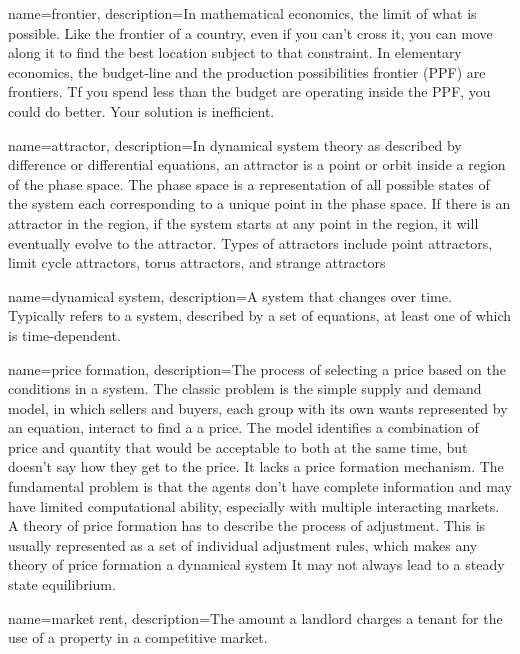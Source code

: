 {
name=frontier,
description={In mathematical economics, the limit of what is possible. Like the frontier of a country, even if you can't cross it, you can move along it to find the best location  subject to that constraint. In elementary economics, the budget-line and the production possibilities frontier (PPF) are  frontiers. Tf you spend less than the budget are operating inside the PPF, you could do better. Your solution is inefficient. }
}

{
name=attractor,
description={In \gls{dynamical system} theory as described by difference or differential equations, an attractor is a point or orbit inside a region of the phase space. The phase space is a representation of all possible states of the system each corresponding to a unique point in the phase space. If there is an attractor in the region, if the system starts at any point in the region, it will eventually evolve to the attractor. Types of attractors include point attractors, limit cycle attractors, torus attractors, and strange attractors}
}

{
name=dynamical system,
description={A system that changes over time. Typically refers to %
a system, described by a set of equations, at least one of which is time-dependent.}
}

{
name=price formation,
description={The process of selecting a price based on the conditions in a system. The classic problem is the simple supply and demand model, in which sellers and buyers, each group with its own wants represented by an equation, interact to find a a price. The model  identifies a combination of price and quantity that would be acceptable to both at the same time, but doesn't say how they get to the price. It lacks a price formation mechanism.  \newline The fundamental problem is that the agents don't have complete information and may have limited computational ability, especially with multiple interacting markets. A theory of price formation has to describe the process of adjustment. This is usually represented as a set of individual adjustment rules, which makes any theory of price formation a dynamical system It may not always lead to a steady state equilibrium.}
}


{
name=market rent,
description={The amount a landlord charges a tenant for the use of a property in a competitive market. }
}

